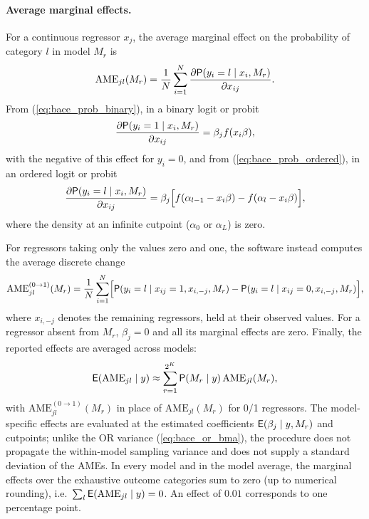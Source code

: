 \paragraph{Average marginal effects.}
For a continuous regressor $x_j$, the average marginal effect on
the probability of category $l$ in model $M_r$ is
\begin{equation}
	\mathrm{AME}_{jl}(M_r)
	=\frac1{N}\sum_{i=1}^{N}
	\frac{\partial\mathsf{P}(y_i=l\mid x_i,M_r)}{\partial x_{ij}}.
	\label{eq:bace_ame_continuous}
\end{equation}
From (\ref{eq:bace_prob_binary}), in a binary logit or probit
\begin{equation}
	\frac{\partial\mathsf{P}(y_i=1\mid x_i,M_r)}{\partial x_{ij}}=\beta_j f(x_i\beta),
	\label{eq:bace_ame_binary}
\end{equation}
with the negative of this effect for $y_i=0$, and from
(\ref{eq:bace_prob_ordered}), in an ordered logit or probit
\begin{equation}
	\frac{\partial\mathsf{P}(y_i=l\mid x_i,M_r)}{\partial x_{ij}}
	=\beta_j\Bigl[f(\alpha_{l-1}-x_i\beta)-f(\alpha_l-x_i\beta)\Bigr],
	\label{eq:bace_ame_ordered}
\end{equation}
where the density at an infinite cutpoint ($\alpha_0$ or $\alpha_L$)
is zero.

For regressors taking only the values zero and one, the software
instead computes the average discrete change
\begin{equation}
	\mathrm{AME}_{jl}^{(0\to1)}(M_r)=\frac1{N}\sum_{i=1}^{N}
	\Bigl[\mathsf{P}(y_i=l\mid x_{ij}=1,x_{i,-j},M_r)
	-\mathsf{P}(y_i=l\mid x_{ij}=0,x_{i,-j},M_r)\Bigr],
	\label{eq:bace_ame_binary_regressor}
\end{equation}
where $x_{i,-j}$ denotes the remaining regressors, held at their observed
values. For a regressor absent from $M_r$, $\beta_j=0$ and all its marginal
effects are zero. Finally, the reported effects are averaged across models:
\begin{equation}
	\mathsf{E}(\mathrm{AME}_{jl}\mid y)\approx\sum_{r=1}^{2^K}\mathsf{P}(M_r\mid y)\,\mathrm{AME}_{jl}(M_r),
	\label{eq:bace_ame_bma}
\end{equation}
with $\mathrm{AME}_{jl}^{(0\to1)}(M_r)$ in place of $\mathrm{AME}_{jl}(M_r)$
for 0/1 regressors. The model-specific effects are evaluated at the
estimated coefficients $\mathsf{E}(\beta_j\mid y,M_r)$ and cutpoints; unlike
the OR variance (\ref{eq:bace_or_bma}), the procedure does not propagate
the within-model sampling variance and does not supply a standard deviation
of the AMEs. In every model and in the model average, the marginal effects
over the exhaustive outcome categories sum to zero (up to numerical
rounding), i.e.\ $\sum_{l}\mathsf{E}(\mathrm{AME}_{jl}\mid y)=0$. An effect of
$0.01$ corresponds to one percentage point.

